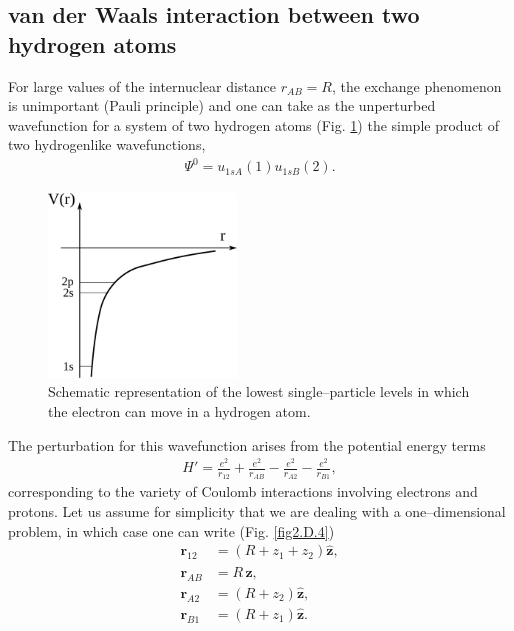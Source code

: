 \begin{subappendices}
\subsection{van der Waals interaction between two hydrogen atoms}
For large values of the internuclear distance $r_{AB}=R$, the exchange phenomenon is unimportant (Pauli principle) and one can take as the unperturbed wavefunction for a system of two hydrogen atoms (Fig. \ref{fig2.D.3}) the simple product of two hydrogenlike wavefunctions,
\begin{align}\label{eq2.D.1}
\Psi^0=u_{1sA}(1)u_{1sB}(2).
\end{align}
   \begin{figure}
    \centerline{\includegraphics*[width=5cm,angle=0]{nutshell/figs/fig3D1_v2.pdf}}
    \caption{Schematic representation of the lowest single--particle levels in which the electron can move in a hydrogen atom.}\label{fig2.D.3}
    \end{figure}
The perturbation for this wavefunction arises from the potential energy terms
\begin{align}\label{eq2.D.2}
H'=\frac{e^2}{r_{12}}+\frac{e^2}{r_{AB}}-\frac{e^2}{r_{A2}}-\frac{e^2}{r_{B1}},
\end{align}
corresponding to the variety of Coulomb interactions involving electrons and protons. Let us assume for simplicity that we are dealing with a one--dimensional problem, in which case one can write (Fig. \ref{fig2.D.4})
\begin{align}\label{eq2.D.3}
\nonumber \mathbf r_{12}&=\left(R+z_1+z_2\right)\hat {\mathbf{z}},\\
\nonumber \mathbf r_{AB}&=R\,\hat {\mathbf{z}},\\
\nonumber \mathbf r_{A2}&=\left(R+z_2\right)\hat {\mathbf{z}},\\
\mathbf r_{B1}&=\left(R+z_1\right)\hat {\mathbf{z}}.
\end{align}


\end{subappendices}
